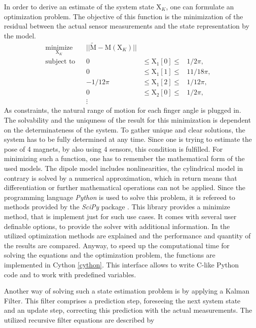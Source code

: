 In order to derive an estimate of the system state $ \mathrm{X}_K $, one can formulate an optimization problem. The objective of this function is the minimization of the residual between the actual sensor measurements and the state representation by the model.
\begin{equation}
\begin{aligned}
\underset{\mathrm{X}_K}{\text{minimize}} & & || \tilde{\mathrm{M}} - \mathrm{M}(\mathrm{X}_K) ||\\
\text{subject to} & & 0 & \leq \mathrm{X}_1[0] \leq & 1/2 \pi, \\
				  & & 0 & \leq \mathrm{X}_1[1]  \leq & 11/18 \pi, \\
				  & & -1/12 \pi & \leq \mathrm{X}_1[2] \leq & 1/12 \pi, \\
				  & & 0 & \leq \mathrm{X}_2[0]  \leq & 1/2 \pi, \\
				  & & \vdots
\end{aligned}
\end{equation}
As constraints, the natural range of motion for each finger angle is plugged in. The solvability and the uniquness of the result for this minimization is dependent on the determinateness of the system. To gather unique and clear solutions, the system has to be fully determined at any time. Since one is trying to estimate the pose of 4 magnets, by also using 4 sensors, this condition is fulfilled. For minimizing such a function, one has to remember the mathematical form of the used models. The dipole model includes nonlinearities, the cylindrical model in contrary is solved by a numerical approximation, which in return means that differentiation or further mathematical operations can not be applied. Since the programming language \emph{Python} \cite{python} is used to solve this problem, it is refereed to methods provided by the \emph{SciPy} \cite{scipy} package . This library provides a minimize method, that is implement just for such use cases. It comes with several user definable options, to provide the solver with additional information. In  the utilized optimization methods are explained and the performance and quantity of the results are compared. Anyway, to speed up the computational time for solving the equations and the optimization problem, the functions are implemented in Cython \ref{cython}. This interface allows to write C-like Python code and to work with predefined variables. 

Another way of solving such a state estimation problem is by applying a Kalman Filter. This filter comprises a prediction step, foreseeing the next system state and an update step, correcting this prediction with the actual measurements. The utilized recursive filter equations are described by

